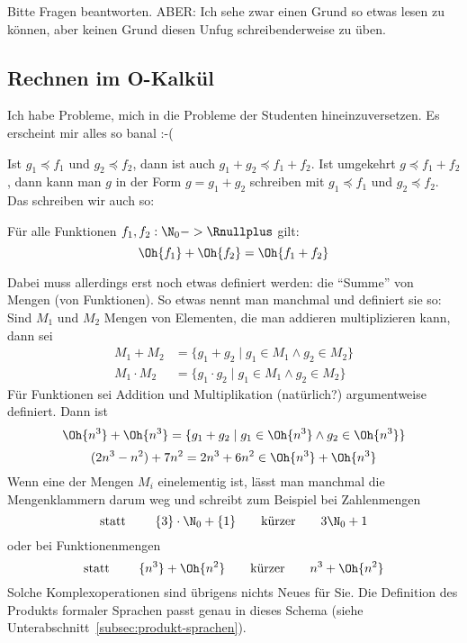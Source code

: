 \begin{tutorium}
  Bitte Fragen beantworten. ABER: Ich sehe zwar einen Grund so etwas
  lesen zu können, aber keinen Grund diesen Unfug schreibenderweise zu
  üben.
\end{tutorium}

\Tut\subsection{Rechnen im O-Kalk\"ul}
\label{subsec:O-kalkuel}

\begin{tutorium}
  Ich habe Probleme, mich in die Probleme der Studenten
  hineinzuversetzen. Es erscheint mir alles so banal :-(
\end{tutorium}

Ist $g_1 \preceq f_1$ und $g_2 \preceq f_2$, dann ist auch $g_1+g_2
\preceq f_1+f_2$.  Ist umgekehrt $g\preceq f_1+f_2$, dann kann man $g$
in der Form $g=g_1+g_2$ schreiben mit $g_1\preceq f_1$ und $g_2\preceq
f_2$.  Das schreiben wir auch so:
\begin{lemma}
  \label{lem:O+O=O}
  Für alle Funktionen $f_1,f_2:\N_0-> \Rnullplus$ gilt:
  \[
  \Oh{f_1} +\Oh{f_2} = \Oh{f_1+f_2}
  \]
\end{lemma}
%
Dabei muss allerdings erst noch etwas definiert werden: die "`Summe"'
von Mengen (von Funktionen). So etwas nennt man manchmal
 und definiert
sie so: Sind $M_1$ und $M_2$ Mengen von Elementen, die man addieren
\bzw multiplizieren kann, dann sei
\begin{align*}
  M_1 + M_2     &= \{g_1 + g_2 \mid g_1\in M_1 \land g_2\in M_2\} \\
  M_1 \cdot M_2 &= \{g_1\cdot g_2 \mid g_1\in M_1 \land g_2\in M_2\}
\end{align*}
%
Für Funktionen sei Addition und Multiplikation (natürlich?)
argumentweise definiert. Dann ist \zB
\[
\Oh{n^3}+\Oh{n^3} = \{g_1+ g_2 \mid g_1\in \Oh{n^3} \land g_2\in
\Oh{n^3}\}
\]
\zB
\[
  (2n^3-n^2) + 7n^2 = 2n^3+6n^2 \in\Oh{n^3}+\Oh{n^3}
\]
Wenn eine der Mengen $M_i$ einelementig ist, lässt man manchmal die
Mengenklammern darum weg und schreibt zum Beispiel bei Zahlenmengen
\[
\text{statt \qquad} \{3\}\cdot \N_0+\{1\} \text{\qquad kürzer\qquad} 3\N_0+1
\]
oder bei Funktionenmengen
\[
\text{statt \qquad} \{n^3\}+\Oh{n^2} \text{\qquad kürzer\qquad} n^3+\Oh{n^2} 
\]
Solche Komplexoperationen sind übrigens nichts Neues für Sie. Die
Definition des Produkts formaler Sprachen passt genau in dieses Schema
(siehe Unterabschnitt~\ref{subsec:produkt-sprachen}).

